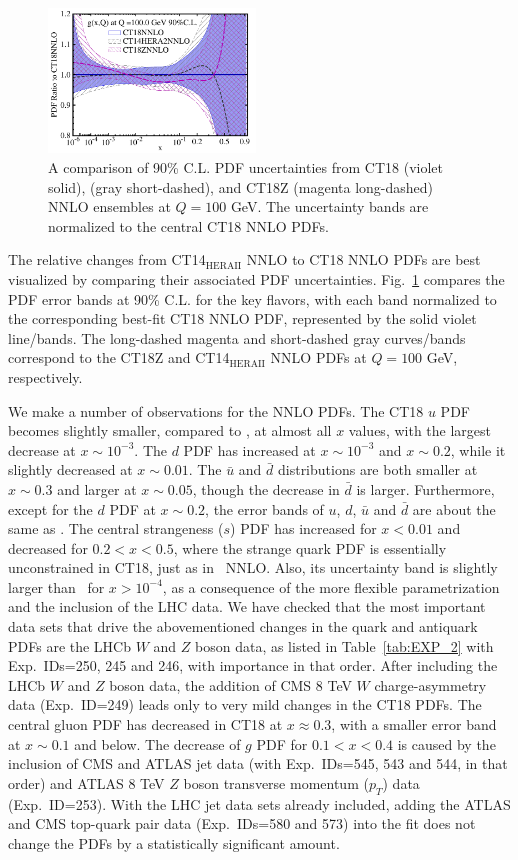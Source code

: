 \begin{figure}[p]
	\includegraphics[width=0.49\textwidth]{./fig/g_100_CT18.pdf}
	\caption{A comparison of 90\% C.L. PDF uncertainties from CT18 (violet solid), \CTHERAII (gray short-dashed), and CT18Z (magenta long-dashed) NNLO ensembles at $Q=100$ GeV. The uncertainty bands are normalized to the central CT18 NNLO PDFs.
		\label{fig:PDFbands1}}
\end{figure}


The relative changes from CT14$_\mathrm{HERAII}$ NNLO to CT18 NNLO PDFs are
best visualized by comparing their associated PDF uncertainties. Fig.~\ref{fig:PDFbands1}
compares the PDF error bands at 90\% C.L. for the key flavors, with each band
normalized to the corresponding best-fit CT18 NNLO PDF, represented by the
solid violet line/bands. The long-dashed magenta and short-dashed gray curves/bands correspond
to the CT18Z and CT14$_\mathrm{HERAII}$ NNLO PDFs at $Q=100$ GeV, respectively.


We make a number of observations for the NNLO PDFs. The CT18 $u$ PDF becomes slightly
smaller, compared to \CTHERAII, at almost all $x$ values, with the largest decrease at $x \sim 10^{-3}$.
The $d$ PDF has increased at $x \sim 10^{-3}$ and $x \sim 0.2$, while it slightly decreased at $ x\sim 0.01$. 
The $\bar u$ and $\bar d$ distributions are both smaller at $x \sim 0.3$ and larger at $x \sim 0.05$, 
though the decrease in $\bar d$ is larger. 
Furthermore, except for the $d$ PDF at $ x\sim 0.2$, the error bands of $u$, $d$, $\bar u$ and $\bar d$ 
are about the same as \CTHERAII.
The central strangeness ($s$) PDF has increased for $ x < 0.01$ and decreased for $0.2< x < 0.5$, where  
the strange quark PDF is essentially unconstrained in CT18, just as in \CTHERAII~NNLO.
Also, its uncertainty band is slightly larger than \CTHERAII~for $x > 10^{-4}$, 
as a consequence of the more flexible parametrization and the inclusion of the LHC data.
We have checked that the most important data sets that drive
the abovementioned changes 
in the quark and antiquark PDFs are the LHCb $W$ and $Z$ boson data, as listed in 
Table~\ref{tab:EXP_2} 
with Exp.~IDs=250, 245 and 246, with importance in that order. 
After including the LHCb $W$ and $Z$ boson data, the addition of
CMS 8 TeV $W$ charge-asymmetry data (Exp.~ID=249) leads only to very mild changes in the CT18 PDFs. The central gluon PDF has
decreased in CT18 at $x\approx 0.3$, with a smaller error band at $x \sim 0.1$ and below. 
The decrease of $g$ PDF for $0.1 < x < 0.4$ is caused by the inclusion of CMS and ATLAS jet data (with
Exp.~IDs=545, 543 and 544, in that order) and ATLAS 8 TeV $Z$ boson transverse momentum ($p_T$) data (Exp.~ID=253). 
With the LHC jet data sets already included, adding the ATLAS and CMS top-quark pair data (Exp.~IDs=580 and 573) into the fit does not change the PDFs by a statistically significant amount. 

